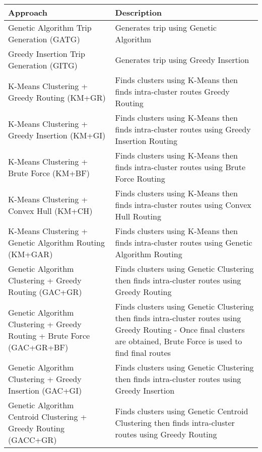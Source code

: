 \begin{center}
    \caption{Lists and describes all approaches evaluated.}\label{tab:approaches}
    \footnotesize
    \begin{longtable}[H]{| p{6cm} | p{9cm} |}
        \hline
        Approach & Description \\
        \hline
        Genetic Algorithm Trip Generation (GATG) & Generates trip using Genetic Algorithm \\
        \hline
        Greedy Insertion Trip Generation (GITG) & Generates trip using Greedy Insertion \\
        \hline
        K-Means Clustering + Greedy Routing (KM+GR) & Finds clusters using K-Means then finds intra-cluster routes
        Greedy Routing \\
        \hline
        K-Means Clustering + Greedy Insertion (KM+GI) & Finds clusters using K-Means then finds intra-cluster routes
        using Greedy Insertion Routing \\
        \hline
        K-Means Clustering + Brute Force (KM+BF) & Finds clusters using K-Means then finds intra-cluster routes using
        Brute Force Routing \\
        \hline
        K-Means Clustering + Convex Hull (KM+CH) & Finds clusters using K-Means then finds intra-cluster routes using
        Convex Hull Routing \\
        \hline
        K-Means Clustering + Genetic Algorithm Routing (KM+GAR) & Finds clusters using K-Means then finds intra-cluster
        routes using Genetic Algorithm Routing \\
        \hline
        Genetic Algorithm Clustering + Greedy Routing (GAC+GR) & Finds clusters using Genetic Clustering then finds
        intra-cluster routes using Greedy Routing \\
        \hline
        Genetic Algorithm Clustering + Greedy Routing + Brute Force (GAC+GR+BF) & Finds clusters using Genetic
        Clustering then finds intra-cluster routes using Greedy Routing - Once final clusters are obtained,
        Brute Force is used to find final routes \\
        \hline
        Genetic Algorithm Clustering + Greedy Insertion (GAC+GI) & Finds clusters using Genetic Clustering then
        finds intra-cluster routes using Greedy Insertion \\
        \hline
        Genetic Algorithm Centroid Clustering + Greedy Routing (GACC+GR) & Finds clusters using Genetic Centroid
        Clustering then finds intra-cluster routes using Greedy Routing \\

\end{longtable}
\end{center}
